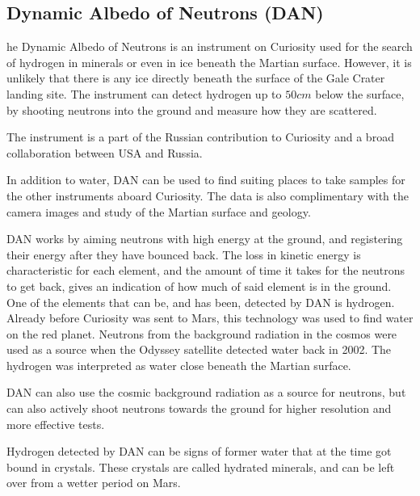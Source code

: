 \subsection{Dynamic Albedo of Neutrons (DAN)}
he Dynamic Albedo of Neutrons is an instrument on Curiosity used for the search of hydrogen in minerals or even in ice beneath the Martian surface.
However, it is unlikely that there is any ice directly beneath the surface of the Gale Crater landing site.
The instrument can detect hydrogen up to $50 cm$ below the surface, by shooting neutrons into the ground and measure how they are scattered.

The instrument is a part of the Russian contribution to Curiosity and a broad collaboration between USA and Russia.

In addition to water, DAN can be used to find suiting places to take samples for the other instruments aboard Curiosity.
The data is also complimentary with the camera images and study of the Martian surface and geology.

DAN works by aiming neutrons with high energy at the ground, and registering their energy after they have bounced back.
The loss in kinetic energy is characteristic for each element, and the amount of time it takes for the neutrons to get back, gives an indication of how much of said element is in the ground.
One of the elements that can be, and has been, detected by DAN is hydrogen.
Already before Curiosity was sent to Mars, this technology was used to find water on the red planet.
Neutrons from the background radiation in the cosmos were used as a source when the Odyssey satellite detected water back in 2002.
The hydrogen was interpreted as water close beneath the Martian surface.

DAN can also use the cosmic background radiation as a source for neutrons, but can also actively shoot neutrons towards the ground for higher resolution and more effective tests.

Hydrogen detected by DAN can be signs of former water that at the time got bound in crystals.
These crystals are called hydrated minerals, and can be left over from a wetter period on Mars.